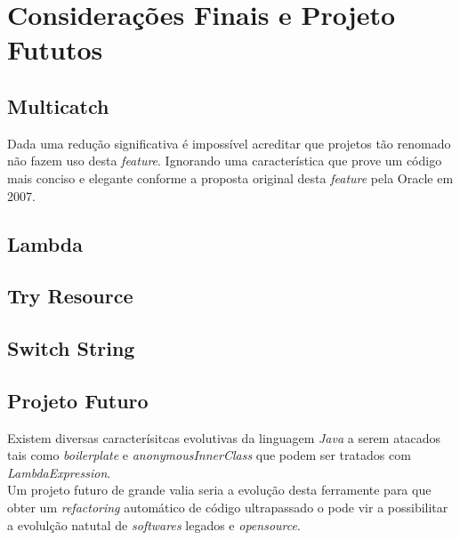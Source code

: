 \chapter{Considerações Finais e Projeto Fututos}

\section{Multicatch}
Dada uma redução significativa é impossível acreditar que projetos tão renomado não fazem uso desta \textit{feature}.  Ignorando uma característica que prove um código mais conciso e elegante conforme a proposta original desta \textit{feature} pela Oracle em 2007.\\

\section{Lambda}



\section{Try Resource}


\section{Switch String}

\section{Projeto Futuro}
Existem diversas caracterísitcas evolutivas da linguagem \textit{Java} a serem atacados tais como \textit{boilerplate} e \textit{anonymousInnerClass} que podem ser tratados com \textit{LambdaExpression}.\\
Um projeto futuro de grande valia seria a evolução desta ferramente para que obter um \textit{refactoring} automático de código ultrapassado o pode vir a possibilitar a evolulção natutal de \textit{softwares} legados e \textit{opensource}.